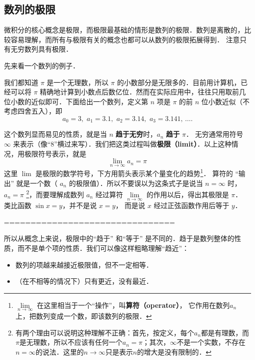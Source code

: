 
\subsection{数列的极限}

微积分的核心概念是极限，而极限最基础的情形是数列的极限．数列是离散的，比较容易理解，而所有与极限有关的概念也都可以从数列的极限拓展得到． 注意只有无穷数列具有极限．

先来看一个数列的例子．

\begin{example}{}\label{Lim_ex1}
我们都知道 $\pi$ 是一个无理数，所以 $\pi$ 的小数部分是无限多的．目前用计算机，已经可以将 $\pi$ 精确地计算到小数点后数亿位．然而在实际应用中，往往只用取前几位小数的近似即可．下面给出一个数列，定义第 $n$ 项是 $\pi$ 的前 $n$ 位小数近似（不考虑四舍五入），即
\begin{equation}
a_0 = 3,\,\, a_1 = 3.1,\,\, a_2 = 3.14,\,\, a_3 = 3.141,\,\dots.
\end{equation}
\end{example}

这个数列显而易见的性质，就是当 $n$ \textbf{趋于无穷}时，$a_n$ \textbf{趋于} $\pi$． 无穷通常用符号 $\infty$ 来表示（像“8”横过来写）．我们把这类过程叫做\textbf{极限（limit）}．以上这种情况，用极限符号表示，就是
\begin{equation}
\lim_{n \to \infty } {a_n} = \pi 
\end{equation}
这里 $\lim$ 是极限的数学符号，下方用箭头表示某个量变化的趋势\footnote{$\lim\limits_{n \to \infty }$ 在这里相当于一个“操作”，叫\textbf{算符（operator）}， 它作用在数列$a_n$ 上，把数列变成一个数，即该数列的极限．}． 算符的 “输出” 就是一个数（ $a_n$ 的极限值）．所以不要误以为这条式子是说当 $n = \infty$ 时，$a_n=\pi$ \footnote{有两个理由可以说明这种理解不正确：首先，按定义，每个$a_n$都是有理数，而$\pi$是无理数，所以不应该有任何一个$a_n=\pi$；其次，$\infty$不是一个实数，不存在$n=\infty$的说法．这里的$n\to\infty$只是表示$n$的增大是没有限制的．}，而要理解成数列 $a_n$ 经过算符 $\lim\limits_{n \to \infty }$ 的作用以后，得出其极限是 $\pi$． 类比函数 $\sin x = y$，并不是说 $x=y$， 而是说 $x$ 经过正弦函数作用后等于 $y$． 


================================






所以从概念上来说，极限中的“趋于” 和“等于” 是不同的．趋于是数列整体的性质，而不是单个项的性质．我们可以像这样粗略理解“趋近”：
\begin{itemize}
\item 数列的项越来越接近极限值，但不一定相等．
\item （在不相等的情况下）只有更近，没有最近．
\end{itemize}

